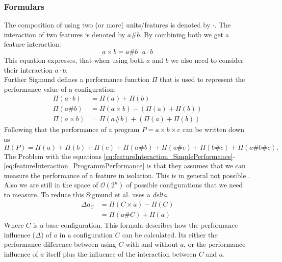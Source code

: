 \subsubsection{Formulars}
The composition of using two (or more) units/features is denoted by $\cdot$. The interaction of two features is denoted by $a\#b$. By combining both we get a feature interaction:
\begin{equation}
 a \times b = a\#b \cdot a \cdot b
\end{equation} 
This equation expresses, that when using both $a$ and $b$ we also need to consider their interaction $a\cdot b$.\\
Further Sigmund defines a performance function $\Pi$ that is used to represent the performance value of a configuration:
\begin{align}
\Pi(a \cdot b) &= \Pi(a) + \Pi(b)\label{eq:featureInteraction_SimplePerformance}\\
\Pi(a\#b) &= \Pi(a \times b) - (\Pi(a) + \Pi(b))\\
\Pi(a \times b) &=  \Pi(a\#b) + (\Pi(a) + \Pi(b))\label{eq:featureInteraction_InteractionPerformances}
\end{align}
Following that the performance of a program $P = a \times b \times c$ can be written down as
\begin{equation}\label{eq:featureInteraction_ProgrammPerformance}
\Pi(P) = \Pi(a) +  \Pi(b) +  \Pi(c) +  \Pi(a\#b) +  \Pi(a\#c) +  \Pi(b\#c) +  \Pi(a\#b\#c). 
\end{equation}
The Problem with the equations \ref{eq:featureInteraction_SimplePerformance}-\ref{eq:featureInteraction_ProgrammPerformance} is that they assumes that we can measure the performance of a feature in isolation. This is in general not possible \cite{AutomatedFeatureDetectionSiegmund2012}. Also we are still in the space of $\mathcal{O}(2^n)$ of possible configurations that we need to measure.  
To reduce this Sigmund et al. uses a \textit{delta}. 
\begin{equation}
\begin{split}
\Delta a_C &= \Pi(C\times a) - \Pi(C)\\
&=\Pi(a\# C) + \Pi(a)
\end{split}
\end{equation}
Where $C$ is a base configuration. This formula describes how the performance influence ($\Delta$) of $a$ in a configuration $C$ can be calculated. Its either the performance difference between using $C$ with and without $a$, or the performance influence of $a$ itself plus the influence of the interaction between $C$ and $a$.
